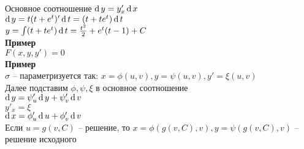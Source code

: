 \documentclass[12pt]{article}
\begin{document}
Основное соотношение $\operatorname{d} y = y'_x\operatorname{d} x$\\
$\operatorname{d} y = t(t+e^t)'\operatorname{d} t = (t+te^t)\operatorname{d} t$\\
$y = \int (t+te^t)\operatorname{d} t = \frac{t^2}2 + e^t(t-1)+C$\\
\textbf{Пример}\\
$F(x,y,y') = 0$\\
\textbf{Пример}\\
$\sigma$ -- параметризуется так: $x=\phi(u,v), y = \psi(u,v), y'=\xi(u,v)$\\
Далее подставим $\phi,\psi,\xi$ в основное соотношение\\
$\operatorname{d} y = \psi'_u\operatorname{d} y + \psi'_v\operatorname{d} v$\\
$y'_x = \xi$\\
$\operatorname{d} x = \phi'_u\operatorname{d} u + \phi'_v\operatorname{d} v$\\
Если $u=g(v,C)$ -- решение, то $x = \phi(g(v, C), v), y=\psi(g(v,C), v)$ -- решение исходного\\
\end{document}
